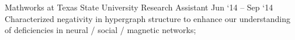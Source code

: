 \experience
    {Mathworks at Texas State University}
    {Research Assistant}
    {Jun `14 -- Sep `14}
    {
        Characterized negativity in hypergraph structure to enhance our understanding of
        deficiencies in neural / social / magnetic networks;
    }
